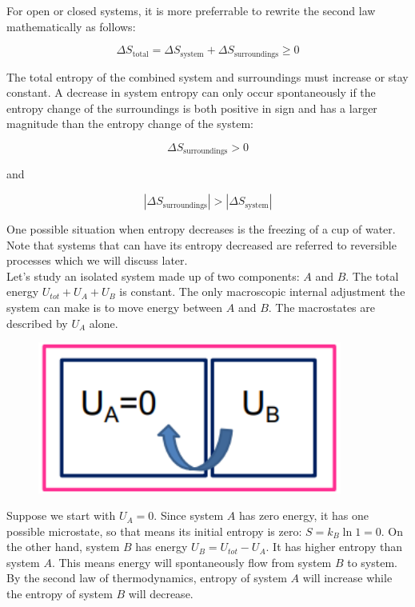 \documentclass[12pt, a4paper]{article}
\begin{document}
For open or closed systems, it is more preferrable to rewrite the second law mathematically as follows:

\[ \Delta S_\text{total} = \Delta S_\text{system} + \Delta S_\text{surroundings} \ge 0 \]

The total entropy of the combined system and surroundings must increase or stay constant. A decrease in system entropy can only occur spontaneously if the entropy change of the surroundings is both positive in sign and has a larger magnitude than the entropy change of the system:

\[\Delta S_\text{surroundings} > 0\]

and

\[\left|\Delta S_\text{surroundings}\right| > \left|\Delta S_\text{system}\right|\]

One possible situation when entropy decreases is the freezing of a cup of water. Note that systems that can have its entropy decreased are referred to reversible processes which we will discuss later. \\

Let's study an isolated system made up of two components: $A$ and $B$. The total energy $U_{tot}+U_A+U_B$ is constant. The only macroscopic internal adjustment the system can make is to move energy between $A$ and $B$. The macrostates are described by $U_A$ alone.

\begin{figure}[H]
\centering
\includegraphics[width=100mm]{32.png}
\end{figure}

Suppose we start with $U_A=0$. Since system $A$ has zero energy, it has one possible microstate, so that means its initial entropy is zero: $S=k_B\ln1=0$. On the other hand, system $B$ has energy $U_B=U_{tot}-U_A$. It has higher entropy than system $A$. This means energy will spontaneously flow from system $B$ to system. By the second law of thermodynamics, entropy of system $A$ will increase while the entropy of system $B$ will decrease.
\end{document}
